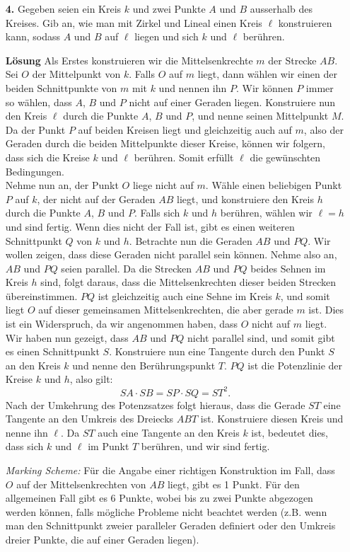 \documentclass[language=german,style=solution]{smo}
\begin{document}
\begin{enumerate}
\item[\textbf{4.}] Gegeben seien ein Kreis $k$ und zwei Punkte $A$ und $B$ ausserhalb des Kreises. Gib an, wie man mit Zirkel und Lineal einen Kreis $\ell$ konstruieren kann, sodass $A$ und $B$ auf $\ell$ liegen und sich $k$ und $\ell$ berühren.

\textbf{Lösung} Als Erstes konstruieren wir die Mittelsenkrechte $m$ der Strecke $AB$. Sei $O$ der Mittelpunkt von $k$. Falls $O$ auf $m$ liegt, dann wählen wir einen der beiden Schnittpunkte von $m$ mit $k$ und nennen ihn $P$. Wir können $P$ immer so wählen, dass $A$, $B$ und $P$ nicht auf einer Geraden liegen. Konstruiere nun den Kreis $\ell$ durch die Punkte $A$, $B$ und $P$, und nenne seinen Mittelpunkt $M$. Da der Punkt $P$ auf beiden Kreisen liegt und gleichzeitig auch auf $m$, also der Geraden durch die beiden Mittelpunkte dieser Kreise, können wir folgern, dass sich die Kreise $k$ und $\ell$ berühren. Somit erfüllt $\ell$ die gewünschten Bedingungen.\\
Nehme nun an, der Punkt $O$ liege nicht auf $m$. Wähle einen beliebigen Punkt $P$ auf $k$, der nicht auf der Geraden $AB$ liegt, und konstruiere den Kreis $h$ durch die Punkte $A$, $B$ und $P$. Falls sich $k$ und $h$ berühren, wählen wir $\ell=h$ und sind fertig. Wenn dies nicht der Fall ist, gibt es einen weiteren Schnittpunkt $Q$ von $k$ und $h$. Betrachte nun die Geraden $AB$ und $PQ$. Wir wollen zeigen, dass diese Geraden nicht parallel sein können. Nehme also an, $AB$ und $PQ$ seien parallel. Da die Strecken $AB$ und $PQ$ beides Sehnen im Kreis $h$ sind, folgt daraus, dass die Mittelsenkrechten dieser beiden Strecken übereinstimmen. $PQ$ ist gleichzeitig auch eine Sehne im Kreis $k$, und somit liegt $O$ auf dieser gemeinsamen Mittelsenkrechten, die aber gerade $m$ ist. Dies ist ein Widerspruch, da wir angenommen haben, dass $O$ nicht auf $m$ liegt.\\
Wir haben nun gezeigt, dass $AB$ und $PQ$ nicht parallel sind, und somit gibt es einen Schnittpunkt $S$. Konstruiere nun eine Tangente durch den Punkt $S$ an den Kreis $k$ und nenne den Berührungspunkt $T$. $PQ$ ist die Potenzlinie der Kreise $k$ und $h$, also gilt:
\[
SA\cdot SB=SP\cdot SQ=ST^2.
\]
Nach der Umkehrung des Potenzsatzes folgt hieraus, dass die Gerade $ST$ eine Tangente an den Umkreis des Dreiecks $ABT$ ist. Konstruiere diesen Kreis und nenne ihn $\ell$. Da $ST$ auch eine Tangente an den Kreis $k$ ist, bedeutet dies, dass sich $k$ und $\ell$ im Punkt $T$ berühren, und wir sind fertig.

\textit{Marking Scheme:} Für die Angabe einer richtigen Konstruktion im Fall, dass $O$ auf der Mittelsenkrechten von $AB$ liegt, gibt es 1 Punkt. Für den allgemeinen Fall gibt es 6 Punkte, wobei bis zu zwei Punkte abgezogen werden können, falls mögliche Probleme nicht beachtet werden (z.B. wenn man den Schnittpunkt zweier paralleler Geraden definiert oder den Umkreis dreier Punkte, die auf einer Geraden liegen).


\end{enumerate}
\end{document}

